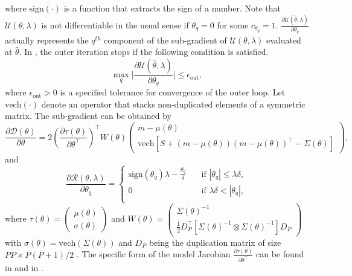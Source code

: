 \documentclass[nojss]{jss}
\begin{document}
where $\mathrm{sign}(\cdot)$ is a function that extracts the sign of a number. Note that $\mathcal{U}(\theta, \lambda)$ is not differentiable in the usual sense if $\theta_q=0$ for some $c_{\theta_q} = 1$. $\frac{\partial \mathcal{U}(\hat{\theta}, \lambda)}{\partial \theta_q}$ actually represents the $q^{th}$ component of the sub-gradient of $\mathcal{U}(\theta, \lambda)$ evaluated at $\hat{\theta}$. In , the outer iteration stops if the following condition is satisfied.
%
\begin{equation} \label{eq:out_stop}
\max_{q} \bigg | \frac{\partial \mathcal{U}(\hat{\theta}, \lambda)}{\partial \theta_q} \bigg | \leq \epsilon_{\mathrm{out}}, 
\end{equation}
%
where $\epsilon_{\mathrm{out}}>0$ is a specified tolerance for convergence of the outer loop. Let $\text{vech}(\cdot)$ denote an operator that stacks non-duplicated elements of a symmetric matrix. The sub-gradient can be obtained by 
%
\begin{equation} \label{eq:loss_derivative}
\frac{\partial \mathcal{D}(\theta)}{\partial \theta} = 
2 \left( \frac{\partial \tau(\theta)}{\partial \theta^\top} \right) ^\top  W(\theta) 
\begin{pmatrix}
   m - \mu(\theta) \\
  \text{vech}[S + (m - \mu(\theta))(m - \mu(\theta))^\top  -\Sigma(\theta)]
\end{pmatrix},
\end{equation}
%
and
%
\begin{equation} \label{eq:regularizer_derivative}
\frac{\partial \mathcal{R}(\theta, \lambda)}{\partial \theta_q} =
  \begin{cases}
    \text{sign}(\theta_q) \lambda - \frac{\theta_q}{\delta}  & \quad \text{if } |\theta_q| \leq \lambda \delta,\\
    0 & \quad \text{if } \lambda \delta <|\theta_q|, \\
  \end{cases}
\end{equation}
%
where 
$
\tau(\theta)=
\begin{pmatrix}
  \mu(\theta) \\
 \sigma(\theta)
\end{pmatrix}
$
 and 
$
W(\theta)=
\begin{pmatrix}
   \Sigma(\theta)^{-1} \\
  \tfrac{1}{2} D_P^\top[\Sigma(\theta)^{-1} \otimes \Sigma(\theta)^{-1}] D_P
\end{pmatrix}
$
with $\sigma(\theta)=\text{vech}(\Sigma(\theta))$ and $D_P$ being the duplication matrix of size $PP \times P(P+1)/2$ \citep[see][]{magnus99}. The specific form of the model Jacobian $\frac{\partial \tau(\theta)}{\partial \theta^\top}$ can be found in \cite{Bentler1980} and in \cite{Neudecker1991}.
\end{document}
